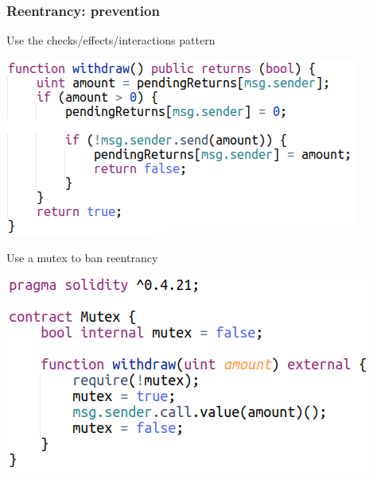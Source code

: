 \documentclass[11pt]{beamer}  %
\begin{document}
\begin{frame}\frametitle{Reentrancy: prevention}

  \begin{greenbox}{Use the checks/effects/interactions pattern}
    \begin{center}
      \includegraphics[scale=0.4,clip=false]{pictures/simple-auction-withdraw-only.png}
    \end{center}
  \end{greenbox}

  \medskip

  \begin{greenbox}{Use a mutex to ban reentrancy}
    \begin{center}
      \includegraphics[scale=0.35,clip=false]{pictures/mutex.png}
    \end{center}
  \end{greenbox}
  
\end{frame}
\end{document}
